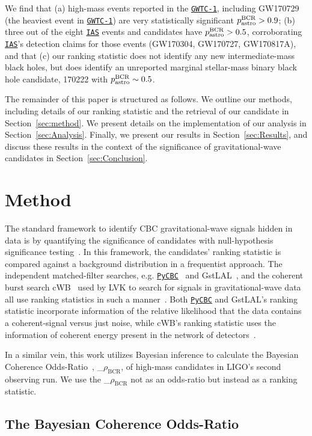 \documentclass[%
 nofootinbib,
 amsmath,amssymb,
 aps,
 twocolumn,
 superscriptaddress
]{revtex4-2}
\newcommand{\gstlal}{{\sc GstLAL}\xspace}
\newcommand{\cwb}{{\sc cWB}\xspace}
\newcommand{\pycbc}{{\sc \href{https://pycbc.org/}{\texttt{PyCBC}}}\xspace}
\newcommand{\GWTC}{{\sc \href{https://ui.adsabs.harvard.edu/abs/2019PhRvX...9c1040A/abstract}{\texttt{GWTC-1}}}\xspace}
\newcommand{\IAS}{{\sc \href{https://ui.adsabs.harvard.edu/abs/2020PhRvD.101h3030V/abstract}{\texttt{IAS}}}\xspace}
\newcommand{\fancytext}[1]{{\relax\ifmmode#1\else $#1$\fi}\xspace}
\newcommand{\mathcmd}[1]{{\sc \relax\ifmmode#1\else $#1$\fi}\xspace}
\newcommand{\bcr}{\mathcmd{\rho_\text{BCR}}}
\newcommand{\pastrobcr}{\fancytext{p_\text{astro}^{\text{BCR}}}}
\begin{document}
We find that (a) high-mass events reported in the \GWTC, including GW170729 (the heaviest event in \GWTC) are very statistically significant $\pastrobcr>0.9$; (b) three out of the eight \IAS events and candidates have $\pastrobcr>0.5$, corroborating \IAS's detection claims for those events (GW170304, GW170727, GW170817A), and that (c) our ranking statistic does not identify any new intermediate-mass black holes, but does identify an unreported marginal stellar-mass binary black hole candidate, 170222 with $\pastrobcr\sim0.5$.

The remainder of this paper is structured as follows. We outline our methods, including details of our ranking statistic and the retrieval of our candidate in Section~\ref{sec:method}. We present details on the implementation of our analysis in Section~\ref{sec:Analysis}. Finally, we present our results in Section~\ref{sec:Results}, and discuss these results in the context of the significance of gravitational-wave candidates in Section~\ref{sec:Conclusion}.

\section{Method\label{sec:method}}

The standard framework to identify CBC gravitational-wave signals hidden in data is by quantifying the significance of candidates with null-hypothesis significance testing~\cite{GWTC1, GWTC2}. In this framework, the candidates' ranking statistic is compared against a background distribution in a frequentist approach. The independent matched-filter searches, e.g. \pycbc~\cite{pycbc_og4} and \gstlal~\cite{sachdev2019gstlal}, and the coherent burst search \cwb~\cite{cwb} used by LVK to search for signals in gravitational-wave data all use ranking statistics in such a manner~\cite{GWTC1}. Both \pycbc and \gstlal's ranking statistic incorporate information of the relative likelihood that the data contains a coherent-signal versus just noise, while \cwb's ranking statistic uses the information of coherent energy present in the network of detectors~\cite{GWTC1}. 

In a similar vein, this work utilizes Bayesian inference to calculate the Bayesian Coherence Odds-Ratio~\cite{BCR1}, \bcr, of high-mass candidates in LIGO's second observing run. We use the \bcr not as an odds-ratio but instead as a ranking statistic.


\subsection{The Bayesian Coherence Odds-Ratio}
\end{document}
